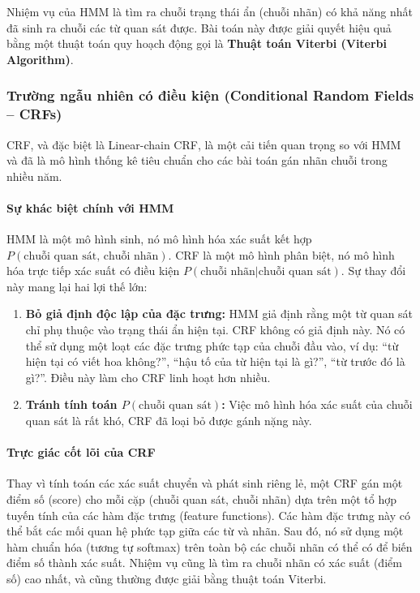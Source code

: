 Nhiệm vụ của HMM là tìm ra chuỗi trạng thái ẩn (chuỗi nhãn) có khả năng nhất đã sinh ra chuỗi các từ quan sát được. Bài toán này được giải quyết hiệu quả bằng một thuật toán quy hoạch động gọi là \textbf{Thuật toán Viterbi (Viterbi Algorithm)}.

\subsubsection{Trường ngẫu nhiên có điều kiện (Conditional Random Fields -- CRFs)}
CRF, và đặc biệt là Linear-chain CRF, là một cải tiến quan trọng so với HMM và đã là mô hình thống kê tiêu chuẩn cho các bài toán gán nhãn chuỗi trong nhiều năm.

\paragraph{Sự khác biệt chính với HMM}
HMM là một mô hình sinh, nó mô hình hóa xác suất kết hợp $P(\text{chuỗi quan sát, chuỗi nhãn})$. CRF là một mô hình phân biệt, nó mô hình hóa trực tiếp xác suất có điều kiện $P(\text{chuỗi nhãn}|\text{chuỗi quan sát})$.
Sự thay đổi này mang lại hai lợi thế lớn:
\begin{enumerate}
    \item \textbf{Bỏ giả định độc lập của đặc trưng:} HMM giả định rằng một từ quan sát chỉ phụ thuộc vào trạng thái ẩn hiện tại. CRF không có giả định này. Nó có thể sử dụng một loạt các đặc trưng phức tạp của chuỗi đầu vào, ví dụ: “từ hiện tại có viết hoa không?”, “hậu tố của từ hiện tại là gì?”, “từ trước đó là gì?”. Điều này làm cho CRF linh hoạt hơn nhiều.
    \item \textbf{Tránh tính toán $P(\text{chuỗi quan sát})$:} Việc mô hình hóa xác suất của chuỗi quan sát là rất khó, CRF đã loại bỏ được gánh nặng này.
\end{enumerate}

\paragraph{Trực giác cốt lõi của CRF}
Thay vì tính toán các xác suất chuyển và phát sinh riêng lẻ, một CRF gán một điểm số (score) cho mỗi cặp (chuỗi quan sát, chuỗi nhãn) dựa trên một tổ hợp tuyến tính của các hàm đặc trưng (feature functions). Các hàm đặc trưng này có thể bắt các mối quan hệ phức tạp giữa các từ và nhãn. Sau đó, nó sử dụng một hàm chuẩn hóa (tương tự softmax) trên toàn bộ các chuỗi nhãn có thể có để biến điểm số thành xác suất. Nhiệm vụ cũng là tìm ra chuỗi nhãn có xác suất (điểm số) cao nhất, và cũng thường được giải bằng thuật toán Viterbi.

